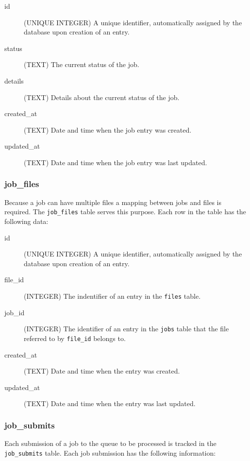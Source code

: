 \begin{description}
    \item[id] (UNIQUE INTEGER)  A unique identifier, automatically assigned by the database upon creation of an entry.
    \item[status] (TEXT) The current status of the job.
    \item[details] (TEXT) Details about the current status of the job.
    \item[created\_at] (TEXT) Date and time when the job entry was created.
    \item[updated\_at] (TEXT) Date and time when the job entry was last updated.
\end{description}

\subsubsection{job\_files}
Because a job can have multiple files a mapping between jobs and files is required. The \texttt{job\_files} table serves this purpose. Each row in the table has the following data:

\begin{description}
    \item[id] (UNIQUE INTEGER)  A unique identifier, automatically assigned by the database upon creation of an entry.
    \item[file\_id] (INTEGER) The indentifier of an entry in the \texttt{files} table.
    \item[job\_id] (INTEGER) The identifier of an entry in the \texttt{jobs} table that the file referred to by \texttt{file\_id} belongs to.
    \item[created\_at] (TEXT) Date and time when the entry was created.
    \item[updated\_at] (TEXT) Date and time when the entry was last updated.
\end{description}

\subsubsection{job\_submits}
Each submission of a job to the queue to be processed is tracked in the \texttt{job\_submits} table. Each job submission has the following information:


